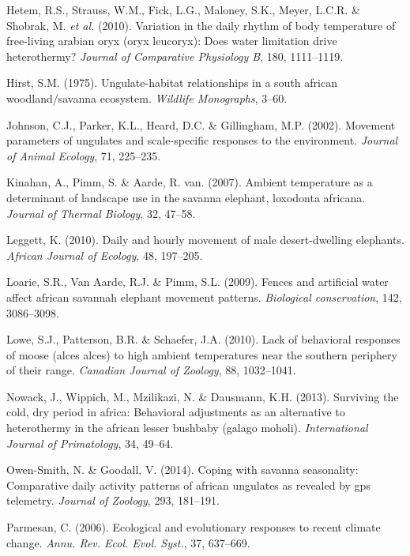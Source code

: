 \documentclass[10pt,twocolumn]{paper}
\begin{document}
\hypertarget{ref-Hetem2010}{}
Hetem, R.S., Strauss, W.M., Fick, L.G., Maloney, S.K., Meyer, L.C.R. \&
Shobrak, M. \emph{et al.} (2010). Variation in the daily rhythm of body
temperature of free-living arabian oryx (oryx leucoryx): Does water
limitation drive heterothermy? \emph{Journal of Comparative Physiology
B}, 180, 1111--1119.

\hypertarget{ref-hirst1975ungulate}{}
Hirst, S.M. (1975). Ungulate-habitat relationships in a south african
woodland/savanna ecosystem. \emph{Wildlife Monographs}, 3--60.

\hypertarget{ref-JANE:JANE595}{}
Johnson, C.J., Parker, K.L., Heard, D.C. \& Gillingham, M.P. (2002).
Movement parameters of ungulates and scale-specific responses to the
environment. \emph{Journal of Animal Ecology}, 71, 225--235.

\hypertarget{ref-KINAHAN200747}{}
Kinahan, A., Pimm, S. \& Aarde, R. van. (2007). Ambient temperature as a
determinant of landscape use in the savanna elephant, loxodonta
africana. \emph{Journal of Thermal Biology}, 32, 47--58.

\hypertarget{ref-AJE:AJE1101}{}
Leggett, K. (2010). Daily and hourly movement of male desert-dwelling
elephants. \emph{African Journal of Ecology}, 48, 197--205.

\hypertarget{ref-loarie2009fences}{}
Loarie, S.R., Van Aarde, R.J. \& Pimm, S.L. (2009). Fences and
artificial water affect african savannah elephant movement patterns.
\emph{Biological conservation}, 142, 3086--3098.

\hypertarget{ref-lowe2010lack}{}
Lowe, S.J., Patterson, B.R. \& Schaefer, J.A. (2010). Lack of behavioral
responses of moose (alces alces) to high ambient temperatures near the
southern periphery of their range. \emph{Canadian Journal of Zoology},
88, 1032--1041.

\hypertarget{ref-Nowack2013}{}
Nowack, J., Wippich, M., Mzilikazi, N. \& Dausmann, K.H. (2013).
Surviving the cold, dry period in africa: Behavioral adjustments as an
alternative to heterothermy in the african lesser bushbaby (galago
moholi). \emph{International Journal of Primatology}, 34, 49--64.

\hypertarget{ref-owensmith2014coping}{}
Owen-Smith, N. \& Goodall, V. (2014). Coping with savanna seasonality:
Comparative daily activity patterns of african ungulates as revealed by
gps telemetry. \emph{Journal of Zoology}, 293, 181--191.

\hypertarget{ref-parmesan2006ecological}{}
Parmesan, C. (2006). Ecological and evolutionary responses to recent
climate change. \emph{Annu. Rev. Ecol. Evol. Syst.}, 37, 637--669.
\end{document}
